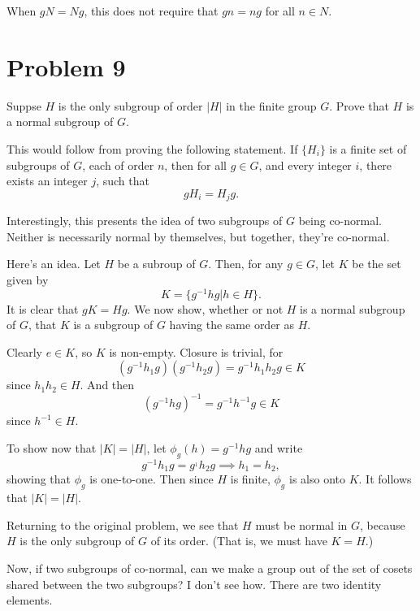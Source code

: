 \documentclass[12pt]{article}
\begin{document}
When $gN=Ng$, this does not require that $gn=ng$ for all $n\in N$.

\section*{Problem 9}

Suppse $H$ is the only subgroup of order $|H|$ in the finite group $G$.
Prove that $H$ is a normal subgroup of $G$.

This would follow from proving the following statement.
If $\{H_i\}$ is a finite set of subgroups of $G$, each of order $n$, then
for all $g\in G$, and every integer $i$, there exists an integer $j$, such that
\begin{equation*}
gH_i = H_jg.
\end{equation*}

Interestingly, this presents the idea of two subgroups of $G$ being
co-normal.  Neither is necessarily normal by themselves, but together,
they're co-normal.

Here's an idea.  Let $H$ be a subroup of $G$.
Then, for any $g\in G$, let $K$ be the set given by
\begin{equation*}
K = \{g^{-1}hg|h\in H\}.
\end{equation*}
It is clear that $gK=Hg$.  We now show, whether or not $H$ is
a normal subgroup of $G$, that $K$ is a subgroup of $G$ having the
same order as $H$.

Clearly $e\in K$, so $K$ is non-empty.  Closure is trivial, for
\begin{equation*}
(g^{-1}h_1g)(g^{-1}h_2g)=g^{-1}h_1h_2g\in K
\end{equation*}
since $h_1h_2\in H$.  And then
\begin{equation*}
(g^{-1}hg)^{-1} = g^{-1}h^{-1}g\in K
\end{equation*}
since $h^{-1}\in H$.

To show now that $|K|=|H|$, let $\phi_g(h)=g^{-1}hg$ and
write
\begin{equation*}
g^{-1}h_1g = g^{_1}h_2g\implies h_1=h_2,
\end{equation*}
showing that $\phi_g$ is one-to-one.  Then since $H$ is finite,
$\phi_g$ is also onto $K$.  It follows that $|K|=|H|$.

Returning to the original problem, we see that $H$ must be normal in $G$,
because $H$ is the only subgroup of $G$ of its order.  (That is, we must have $K=H$.)

Now, if two subgroups of co-normal, can we make a group out of the
set of cosets shared between the two subgroups?  I don't see how.
There are two identity elements.
\end{document}
